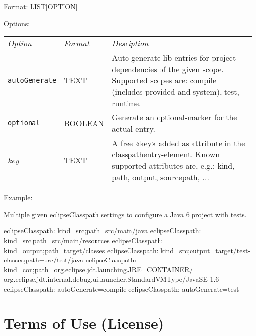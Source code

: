 \documentclass[a4paper,12pt,english,oneside,halfparskip]{scrartcl}
\newcommand{\G}{\par\noindent\ensuremath{\blacktriangleright}~}
\newcommand{\code}[1]{\texttt{#1}}
\begin{document}
Format: LIST[OPTION]

Options:

\begin{tabular}{llp{}}
\emph{Option} & \emph{Format} & \emph{Desciption} \\
\code{autoGenerate} &  TEXT & Auto-generate lib-entries for project dependencies of the given scope. Supported scopes are: compile (includes provided and system), test, runtime. \\
\code{optional} & BOOLEAN & Generate an optional-marker for the actual entry. \\
\emph{key} &  TEXT & A free «key» added as attribute in the classpathentry-element. Known supported attributes are, e.g.: kind, path, output, sourcepath, ... \\
\end{tabular}

Example:

Multiple given eclipseClasspath settings to configure a Java 6 project with tests.

\begin{Cmdline}
eclipseClasspath: kind=src;path=src/main/java
eclipseClasspath: kind=src;path=src/main/resources
eclipseClasspath: kind=output;path=target/classes
eclipseClasspath: kind=src;output=target/test-classes;path=src/test/java
eclipseClasspath: kind=con;path=org.eclipse.jdt.launching.JRE_CONTAINER/\\
org.eclipse.jdt.internal.debug.ui.launcher.StandardVMType/JavaSE-1.6
eclipseClasspath: autoGenerate=compile
eclipseClasspath: autoGenerate=test
\end{Cmdline}




% 
% 
% 


\section{Terms of Use (License)}
\end{document}
